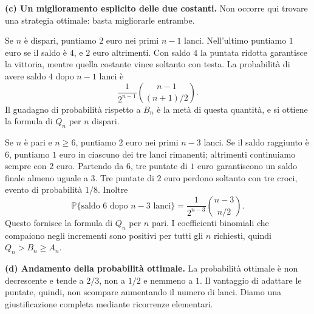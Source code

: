 {\textbf{(c) Un miglioramento esplicito delle due costanti.}
Non occorre qui trovare una strategia ottimale: basta migliorarle entrambe.

Se $n$ \`e dispari, puntiamo $2$ euro nei primi $n-1$ lanci.
Nell'ultimo puntiamo $1$ euro se il saldo \`e $4$, e $2$ euro altrimenti.
Con saldo $4$ la puntata ridotta garantisce la vittoria, mentre quella
costante vince soltanto con testa. La probabilit\`a di avere saldo $4$
dopo $n-1$ lanci \`e
\[
 \frac{1}{2^{n-1}}\binom{n-1}{(n+1)/2}.
\]
Il guadagno di probabilit\`a rispetto a $B_n$ \`e la met\`a di questa
quantit\`a, e si ottiene la formula di $Q_n$ per $n$ dispari.

Se $n$ \`e pari e $n\geq6$, puntiamo $2$ euro nei primi $n-3$ lanci.
Se il saldo raggiunto \`e $6$, puntiamo $1$ euro in ciascuno dei tre
lanci rimanenti; altrimenti continuiamo sempre con $2$ euro.
Partendo da $6$, tre puntate di $1$ euro garantiscono un saldo finale
almeno uguale a $3$. Tre puntate di $2$ euro perdono soltanto con tre
croci, evento di probabilit\`a $1/8$. Inoltre
\[
 \mathbb P\{\text{saldo }6\text{ dopo }n-3\text{ lanci}\}
 =\frac{1}{2^{n-3}}\binom{n-3}{n/2}.
\]
Questo fornisce la formula di $Q_n$ per $n$ pari. I coefficienti
binomiali che compaiono negli incrementi sono positivi per tutti gli
$n$ richiesti, quindi $Q_n>B_n\geq A_n$.

\textbf{(d) Andamento della probabilit\`a ottimale.}
La probabilit\`a ottimale \`e non decrescente e tende a $2/3$, non a $1/2$
e nemmeno a $1$. Il vantaggio di adattare le puntate, quindi, non
scompare aumentando il numero di lanci. Diamo una giustificazione
completa mediante ricorrenze elementari.

}
